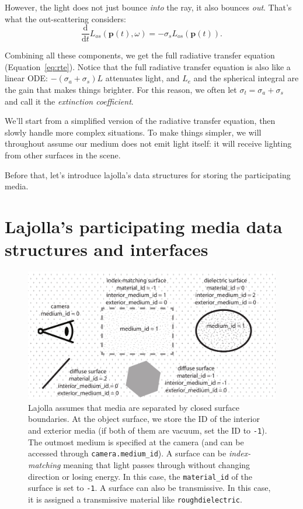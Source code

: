 However, the light does not just bounce \emph{into} the ray, it also bounces \emph{out}. That's what the out-scattering considers:
\begin{equation}
\frac{\mathrm{d}}{\mathrm{d}t} L_{os}(\mathbf{p}(t), \omega) = -\sigma_s L_{os}(\mathbf{p}(t)).
\end{equation}

Combining all these components, we get the full radiative transfer equation (Equation~\ref{eq:rte}). Notice that the full radiative transfer equation is also like a linear ODE: $-(\sigma_a + \sigma_s) L$ attenuates light, and $L_e$ and the spherical integral are the gain that makes things brighter. For this reason, we often let $\sigma_t = \sigma_a + \sigma_s$ and call it the \emph{extinction coefficient}.

We'll start from a simplified version of the radiative transfer equation, then slowly handle more complex situations. To make things simpler, we will throughout assume our medium does not emit light itself: it will receive lighting from other surfaces in the scene.

Before that, let's introduce lajolla's data structures for storing the participating media.

\section{Lajolla's participating media data structures and interfaces}
\begin{figure}
    \includegraphics[width=\linewidth]{imgs/media.pdf}
    \caption{Lajolla assumes that media are separated by closed surface boundaries. At the object surface, we store the ID of the interior and exterior media (if both of them are vacuum, set the ID to \lstinline{-1}). The outmost medium is specified at the camera (and can be accessed through \lstinline{camera.medium_id}). A surface can be \emph{index-matching} meaning that light passes through without changing direction or losing energy. In this case, the \lstinline{material_id} of the surface is set to \lstinline{-1}. A surface can also be transmissive. In this case, it is assigned a transmissive material like \lstinline{roughdielectric}.}
    \label{fig:data_structure}
\end{figure}

